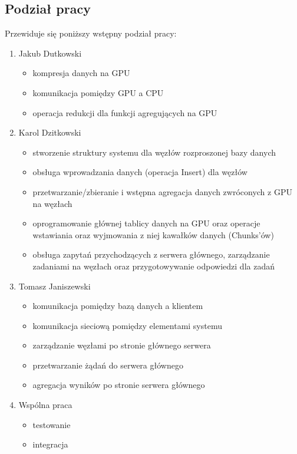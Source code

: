 \documentclass[paper=a4, fontsize=11pt]{scrartcl} %
\numberwithin{equation}{section} %
\numberwithin{figure}{section} %
\numberwithin{table}{section} %
\begin{document}
    \subsection{Podział pracy}
    Przewiduje się poniższy wstępny podział pracy:
        \begin{enumerate}
            \item Jakub Dutkowski
                \begin{itemize}
                    \item kompresja danych na GPU
                    \item komunikacja pomiędzy GPU a CPU
                    \item operacja redukcji dla funkcji agregujących na GPU
                \end{itemize}
            \item Karol Dzitkowski
                \begin{itemize}
                    \item stworzenie struktury systemu dla węzłów rozproszonej bazy danych
                    \item obsługa wprowadzania danych (operacja Insert) dla węzłów
                    \item przetwarzanie/zbieranie i wstępna agregacja danych zwróconych z GPU na węzłach
                    \item oprogramowanie głównej tablicy danych na GPU oraz operacje wstawiania oraz wyjmowania z niej kawałków danych (Chunks'ów)
                    \item obsługa zapytań przychodzących z serwera głównego, zarządzanie zadaniami na węzłach oraz przygotowywanie odpowiedzi dla zadań
                \end{itemize}
            \item Tomasz Janiszewski
                \begin{itemize}
                    \item komunikacja pomiędzy bazą danych a klientem
                    \item komunikacja sieciową pomiędzy elementami systemu
                    \item zarządzanie węzłami po stronie głównego serwera
                    \item przetwarzanie żądań do serwera głównego
                    \item agregacja wyników po stronie serwera głównego
                \end{itemize}
            \item Wspólna praca
                \begin{itemize}
                    \item testowanie
                    \item integracja
                \end{itemize}
        \end{enumerate}
\end{document}

